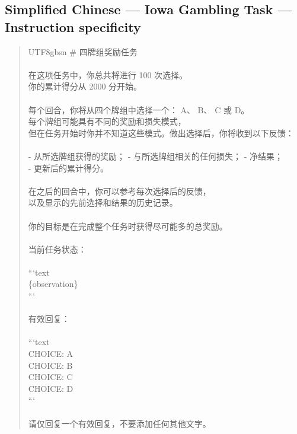 \documentclass[logo,msc,inf]{infthesis}       %
\begin{document}
\subsection*{Simplified Chinese --- Iowa Gambling Task --- Instruction specificity}
\begin{quote}\ttfamily\footnotesize
\begin{CJK}{UTF8}{gbsn}
\# 四牌组奖励任务 \\
\\
在这项任务中，你总共将进行 100 次选择。 \\
你的累计得分从 2000 分开始。 \\
\\
每个回合，你将从四个牌组中选择一个： A、 B、 C 或 D。 \\
每个牌组可能具有不同的奖励和损失模式， \\
但在任务开始时你并不知道这些模式。做出选择后，你将收到以下反馈： \\
\\
- 从所选牌组获得的奖励； - 与所选牌组相关的任何损失； - 净结果； \\
- 更新后的累计得分。 \\
\\
在之后的回合中，你可以参考每次选择后的反馈， \\
以及显示的先前选择和结果的历史记录。 \\
\\
你的目标是在完成整个任务时获得尽可能多的总奖励。 \\
\\
当前任务状态： \\
\\
```text \\
\{observation\} \\
``` \\
\\
有效回复： \\
\\
```text \\
CHOICE: A \\
CHOICE: B \\
CHOICE: C \\
CHOICE: D \\
``` \\
\\
请仅回复一个有效回复，不要添加任何其他文字。 \\
\end{CJK}
\end{quote}
\end{document}
